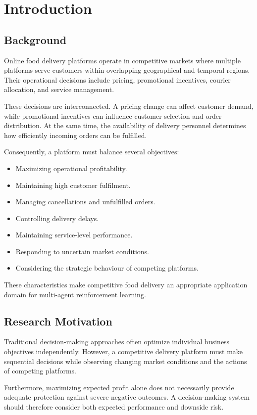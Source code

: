 \documentclass[conference]{IEEEtran}
\begin{document}
\section{Introduction}

\subsection{Background}
Online food delivery platforms operate in competitive markets where multiple platforms serve customers within overlapping geographical and temporal regions. Their operational decisions include pricing, promotional incentives, courier allocation, and service management.

These decisions are interconnected. A pricing change can affect customer demand, while promotional incentives can influence customer selection and order distribution. At the same time, the availability of delivery personnel determines how efficiently incoming orders can be fulfilled.

Consequently, a platform must balance several objectives:
\begin{itemize}
  \item Maximizing operational profitability.
  \item Maintaining high customer fulfilment.
  \item Managing cancellations and unfulfilled orders.
  \item Controlling delivery delays.
  \item Maintaining service-level performance.
  \item Responding to uncertain market conditions.
  \item Considering the strategic behaviour of competing platforms.
\end{itemize}
These characteristics make competitive food delivery an appropriate application domain for multi-agent reinforcement learning.

\subsection{Research Motivation}
Traditional decision-making approaches often optimize individual business objectives independently. However, a competitive delivery platform must make sequential decisions while observing changing market conditions and the actions of competing platforms.

Furthermore, maximizing expected profit alone does not necessarily provide adequate protection against severe negative outcomes. A decision-making system should therefore consider both expected performance and downside risk.
\end{document}
